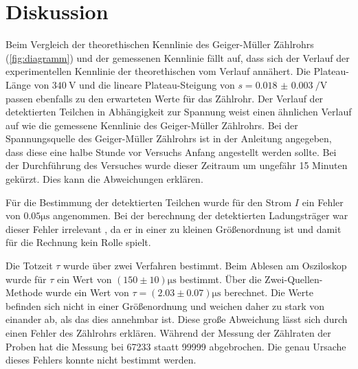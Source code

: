 \section{Diskussion}
\label{sec:diskussion}

Beim Vergleich der theorethischen Kennlinie des Geiger-Müller Zählrohrs (\autoref{fig:diagramm}) und der gemessenen Kennlinie
fällt auf, dass sich der Verlauf der experimentellen Kennlinie der theorethischen vom Verlauf annähert.
Die Plateau-Länge von $\SI{340}{\volt}$ und die lineare Plateau-Steigung von $ s= \qty{0.018(3)}{\per\volt}$ passen ebenfalls
zu den erwarteten Werte für das Zählrohr. Der Verlauf der detektierten Teilchen in Abhängigkeit zur Spannung 
weist einen ähnlichen Verlauf auf wie die gemessene Kennlinie des Geiger-Müller Zählrohrs.
Bei der Spannungsquelle des Geiger-Müller Zählrohrs ist in der Anleitung angegeben, dass diese eine halbe Stunde
vor Versuchs Anfang angestellt werden sollte. Bei der Durchführung des Versuches wurde dieser Zeitraum um ungefähr 15 Minuten 
gekürzt. Dies kann die Abweichungen erklären.

Für die Bestimmung der detektierten Teilchen wurde für den Strom $I$ ein Fehler von $0.05 \si{\micro\second}$ angenommen.
Bei der berechnung der detektierten Ladungsträger war dieser Fehler irrelevant , da er in einer zu kleinen Größenordnung ist und 
damit für die Rechnung kein Rolle spielt.

Die Totzeit $\tau$ wurde über zwei Verfahren bestimmt. Beim Ablesen am Osziloskop wurde für $\tau$ ein Wert von
$\left(150 \pm  10\right) \si{\micro\second}$ bestimmt. Über die Zwei-Quellen-Methode wurde ein Wert von $\tau =\left(2.03 \pm 0.07\right) \si{\micro\second}$
berechnet. Die Werte befinden sich nicht in einer Größenordnung und weichen daher zu stark von einander ab, als das dies annehmbar ist.
Diese große Abweichung lässt sich durch einen Fehler des Zählrohrs erklären. Während der Messung der Zählraten der Proben
hat die Messung bei 67233 staatt 99999 abgebrochen. Die genau Ursache dieses Fehlers konnte nicht bestimmt werden.

\newpage